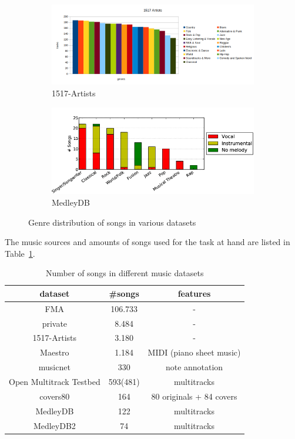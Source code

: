 \begin{figure}[htbp]
{{	\begin{subfigure}{0.55\textwidth}
		\centering
		\includegraphics[scale=0.33]{Images/1517genre.png}
		\caption{1517-Artists}
		\label{1517dist}
	\end{subfigure}
	\begin{subfigure}{0.45\textwidth}
		\centering
		\includegraphics[scale=0.31]{Images/MedleyDB1.png}
		\caption{MedleyDB~\cite[p. 2]{medleydb1}}
		\label{medleydbdist}
	\end{subfigure}
	}}
	\caption{Genre distribution of songs in various datasets}
	\label{fig:datasetdist}
\end{figure}
\FloatBarrier

\noindent The music sources and amounts of songs used for the task at hand are listed in Table~\ref{table_dsets}.

\begin{table}[h]
	\begin{center}
		\begin{tabular}{|c||c|c|}
			\hline
			dataset & \#songs & features\\
			\hline
			\hline
			FMA & 106.733 & -\\
			\hline
			private & 8.484 & -\\
			\hline
			1517-Artists & 3.180 & -\\
			\hline
			Maestro & 1.184 & MIDI (piano sheet music)\\
			\hline
			musicnet & 330  & note annotation\\
			\hline
			Open Multitrack Testbed & 593(481) & multitracks\\
			\hline
			covers80 & 164  & 80 originals + 84 covers\\
			\hline
			MedleyDB &  122  & multitracks\\
			\hline
			MedleyDB2 &  74  & multitracks\\
			\hline
		\end{tabular}
	\end{center}
	\caption{Number of songs in different music datasets}
	\label{table_dsets}
\end{table}
\FloatBarrier


